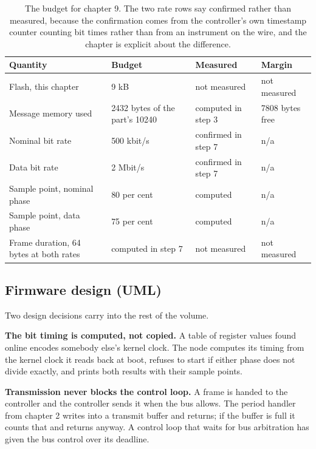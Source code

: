 \begin{table}[H]\centering\small
\begin{tabular}{p{44mm}p{28mm}p{28mm}p{30mm}}
\toprule
Quantity & Budget & Measured & Margin \\
\midrule
Flash, this chapter & 9 kB & not measured & not measured \\
Message memory used & 2432 bytes of the part's 10240 & computed in step 3 & 7808 bytes free \\
Nominal bit rate & 500 kbit/s & confirmed in step 7 & n/a \\
Data bit rate & 2 Mbit/s & confirmed in step 7 & n/a \\
Sample point, nominal phase & 80 per cent & computed & n/a \\
Sample point, data phase & 75 per cent & computed & n/a \\
Frame duration, 64 bytes at both rates & computed in step 7 & not measured & not measured \\
\bottomrule
\end{tabular}
\caption{The budget for chapter 9. The two rate rows say confirmed rather than measured, because the confirmation comes from the controller's own timestamp counter counting bit times rather than from an instrument on the wire, and the chapter is explicit about the difference.}
\end{table}

\subsection*{Firmware design (UML)}


Two design decisions carry into the rest of the volume.

\textbf{The bit timing is computed, not copied.} A table of register values
found online encodes somebody else's kernel clock. The node computes its
timing from the kernel clock it reads back at boot, refuses to start if either
phase does not divide exactly, and prints both results with their sample points.

\textbf{Transmission never blocks the control loop.} A frame is handed to the
controller and the controller sends it when the bus allows. The period handler
from chapter 2 writes into a transmit buffer and returns; if the buffer is full
it counts that and returns anyway. A control loop that waits for bus arbitration
has given the bus control over its deadline.

